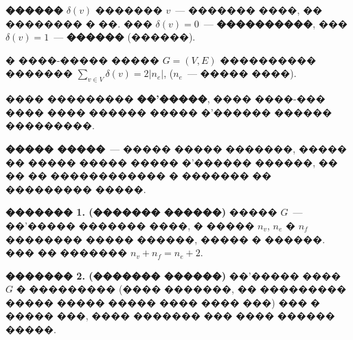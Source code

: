 \documentclass[a4paper,12pt]{article}
\begin{document}
\textbf{������} $\delta(v)$ ������� $v$~--- ������� ����, �� �������� � ��. ��� $\delta(v)=0$~---
\textbf{����������}, ��� $\delta(v)=1$~--- \textbf{������} (������).

� ����-����� ����� $G = (V, E)$ ���������� ������� $\sum\limits_{v\in V}^{}\delta(v)=2|n_{e}|$,
($n_{e}$~--- ����� ����).

���� ��������� \textbf{��'�����}, ���� ����-��� ���� ���� ������ ����� �'������ ������ ���������.

\textbf{����� �����}~--- ����� ����� �������, ����� �� ����� ����� ����� �'������ ������, �� �� �� ������������ � ������� �� ��������� �����.

\textbf{������� 1. (������� ������)} ����� $G$~--- ��'����� ������� ����, � ����� $n_{v}$, $n_{e}$ � $n_{f}$ �������� �����
������, ����� � ������. ��� �� ������� $n_{v}+n_{f}=n_{e}+2$.

\textbf{������� 2. (������� ������)} ��'����� ���� $G$ � ��������� (���� �������, �� ��������� ����� ����� ����� ���� ���� ���) ��� � ����� ���, ���� ������� ��� ���� ������ �����.

\medskip\medskip\medskip
\end{document}
